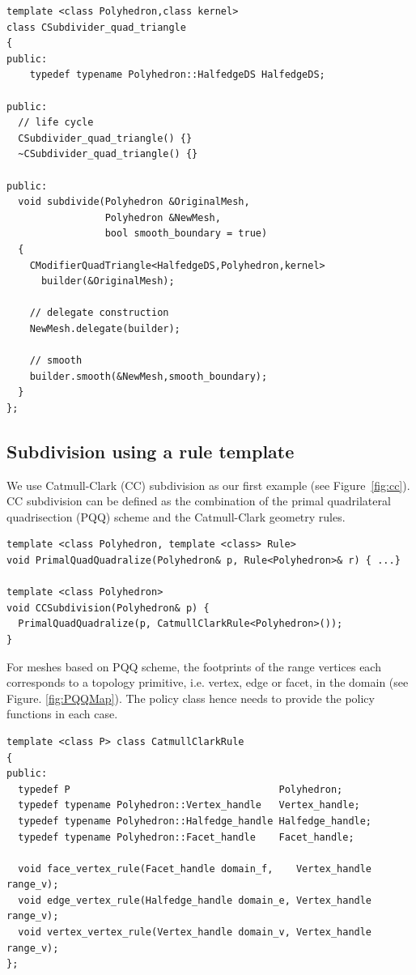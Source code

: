 \documentclass[letter,twoside,10pt]{article}
\begin{document}
{ \scriptsize
\begin{verbatim}
template <class Polyhedron,class kernel>
class CSubdivider_quad_triangle
{
public:
    typedef typename Polyhedron::HalfedgeDS HalfedgeDS;

public:
  // life cycle
  CSubdivider_quad_triangle() {}
  ~CSubdivider_quad_triangle() {}

public:
  void subdivide(Polyhedron &OriginalMesh,
                 Polyhedron &NewMesh,
                 bool smooth_boundary = true)
  {
    CModifierQuadTriangle<HalfedgeDS,Polyhedron,kernel> 
      builder(&OriginalMesh);

    // delegate construction 
    NewMesh.delegate(builder);

    // smooth
    builder.smooth(&NewMesh,smooth_boundary);
  }
};
\end{verbatim}}


\subsection{Subdivision using a rule template}

\label{sec:subdivision_rule}

We use Catmull-Clark (CC) subdivision as our first example (see
Figure~\ref{fig:cc}). CC subdivision can be defined as the combination
of the primal quadrilateral quadrisection (PQQ) scheme and the
Catmull-Clark geometry rules.

{\scriptsize
\begin{verbatim}
template <class Polyhedron, template <class> Rule>
void PrimalQuadQuadralize(Polyhedron& p, Rule<Polyhedron>& r) { ...}

template <class Polyhedron>
void CCSubdivision(Polyhedron& p) { 
  PrimalQuadQuadralize(p, CatmullClarkRule<Polyhedron>());
}
\end{verbatim}
}

For meshes based on PQQ scheme, the footprints of the range vertices
each corresponds to a topology primitive, i.e. vertex, edge or facet,
in the domain (see Figure. \ref{fig:PQQMap}).  The policy class hence
needs to provide the policy functions in each case.

{ \scriptsize
\begin{verbatim}
template <class P> class CatmullClarkRule 
{
public:
  typedef P                                    Polyhedron;
  typedef typename Polyhedron::Vertex_handle   Vertex_handle;
  typedef typename Polyhedron::Halfedge_handle Halfedge_handle;
  typedef typename Polyhedron::Facet_handle    Facet_handle;

  void face_vertex_rule(Facet_handle domain_f,    Vertex_handle range_v);
  void edge_vertex_rule(Halfedge_handle domain_e, Vertex_handle range_v);
  void vertex_vertex_rule(Vertex_handle domain_v, Vertex_handle range_v);
};
\end{verbatim}
}
\end{document}
